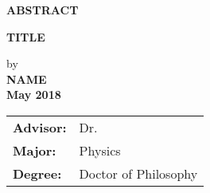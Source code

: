 
\begin{center}
\textbf{ABSTRACT}
	
	
	\singlespacing
\textbf{TITLE}\\
	\doublespacing
	
	by\\
	
	\textbf{NAME}\\
	\textbf{May 2018} \\
\end{center}
\begin{tabular}{ll}	
\textbf{Advisor:} &Dr. \\
\textbf{Major:}   &Physics\\
\textbf{Degree:}  &Doctor of Philosophy
\end{tabular}
\bigskip
